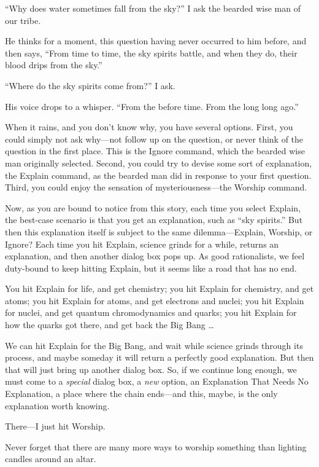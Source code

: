 {
 ``Why does water sometimes fall from the
sky?'' I ask the bearded wise man of our tribe.}

{
 He thinks for a moment, this question having never occurred to him
before, and then says, ``From time to time, the sky
spirits battle, and when they do, their blood drips from the
sky.''}

{
 ``Where do the sky spirits come
from?'' I ask.}

{
 His voice drops to a whisper. ``From the before
time. From the long long ago.''}

{
 When it rains, and you don't know why, you have
several options. First, you could simply not ask why---not follow up on
the question, or never think of the question in the first place. This
is the Ignore command, which the bearded wise man originally selected.
Second, you could try to devise some sort of explanation, the Explain
command, as the bearded man did in response to your first question.
Third, you could enjoy the sensation of mysteriousness---the Worship
command.}

{
 Now, as you are bound to notice from this story, each time you
select Explain, the best-case scenario is that you get an explanation,
such as ``sky spirits.'' But then
this explanation itself is subject to the same dilemma---Explain,
Worship, or Ignore? Each time you hit Explain, science grinds for a
while, returns an explanation, and then another dialog box pops up. As
good rationalists, we feel duty-bound to keep hitting Explain, but it
seems like a road that has no end.}

{
 You hit Explain for life, and get chemistry; you hit Explain for
chemistry, and get atoms; you hit Explain for atoms, and get electrons
and nuclei; you hit Explain for nuclei, and get quantum chromodynamics
and quarks; you hit Explain for how the quarks got there, and get back
the Big Bang \ldots}

{
 We can hit Explain for the Big Bang, and wait while science grinds
through its process, and maybe someday it will return a perfectly good
explanation. But then that will just bring up another dialog box. So,
if we continue long enough, we must come to a \textit{special} dialog
box, a \textit{new} option, an Explanation That Needs No Explanation, a
place where the chain ends---and this, maybe, is the only explanation
worth knowing.}

{
 There---I just hit Worship.}

{
 Never forget that there are many more ways to worship something
than lighting candles around an altar.}

